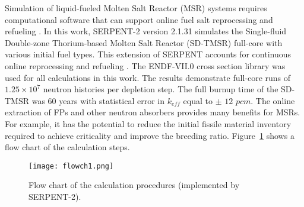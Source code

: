 Simulation of liquid-fueled Molten Salt Reactor (MSR) systems requires 
computational software that can support online fuel salt reprocessing and 
refueling \cite{serp2014molten}. In this work, SERPENT-2 version 2.1.31 \cite{leppanen2014serpent} simulates the 
Single-fluid Double-zone Thorium-based Molten Salt Reactor (SD-TMSR) full-core with various initial fuel types. This extension 
of SERPENT accounts for continuous online reprocessing and refueling 
\cite{aufiero2013extended}. The ENDF-VII.0 cross section library was used for all 
calculations in this work. The results demonstrate full-core runs of 
$1.25\times 10^7$ neutron histories per depletion step. The full burnup time of 
the SD-TMSR was 60 years with statistical error in $k_{eff}$ equal to $\pm$ 
$12$ $pcm$. The online extraction of \gls{FPs} and other neutron absorbers 
provides many benefits for MSRs. For example, it has the potential to reduce the initial 
fissile material inventory required to achieve criticality and improve the 
breeding ratio. Figure~\ref{fig:flow} shows a flow chart of the calculation 
steps. 

\begin{figure}[t!] %
	\texttt{[image: flowch1.png]}
	\caption{Flow chart of the calculation procedures (implemented by SERPENT-2).}
	\label{fig:flow}
\end{figure}

